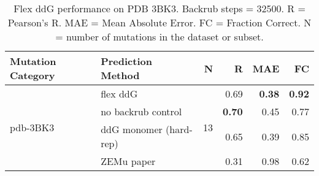 \begin{table}
  \begin{tabular}{llrrrr}
\toprule
Mutation Category &       Prediction Method &   N &    R &  MAE &   FC \\
\midrule
 \multirow{ 4}{*}{pdb-3BK3} & flex ddG & \multirow{ 4}{*}{13} & 0.69 & \textbf{0.38} & \textbf{0.92}  \\
 & no backrub control & & \textbf{0.70} & 0.45 & 0.77  \\
 & ddG monomer (hard-rep) & & 0.65 & 0.39 & 0.85  \\
 & ZEMu paper & & 0.31 & 0.98 & 0.62  \\
\bottomrule
\end{tabular}
  \caption[Flex ddG performance on PDB 3BK3]{
    Flex ddG performance on PDB 3BK3. Backrub steps = 32500. R = Pearson's R. MAE = Mean Absolute Error. FC = Fraction Correct. N = number of mutations in the dataset or subset.
  } \label{tab:table-pdb-3BK3}
\end{table}
